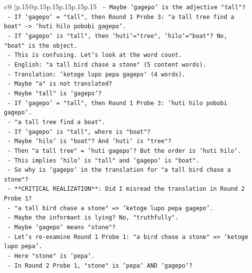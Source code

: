 \documentclass{article}
\begin{document}
{\begin{supertabular}{c@{$\;$}|p{.15\linewidth}@{}p{.15\linewidth}p{.15\linewidth}p{.15\linewidth}p{.15\linewidth}p{.15\linewidth}}
{{{\texttt{      {-} Maybe `gagepo` is the adjective "tall"?} \\
\texttt{      {-} If `gagepo` = "tall", then Round 1 Probe 3: "a tall tree find a boat" {-}> `huti hilo pobobi gagepo`.} \\
\texttt{        {-} If `gagepo` is "tall", then `huti`="tree", `hilo`="boat"? No, "boat" is the object.} \\
\texttt{        {-} This is confusing. Let's look at the word count.} \\
\texttt{        {-} English: "a tall bird chase a stone" (5 content words).} \\
\texttt{        {-} Translation: `ketoge lupo pepa gagepo` (4 words).} \\
\texttt{        {-} Maybe "a" is not translated?} \\
\texttt{        {-} Maybe "tall" is `gagepo`?} \\
\texttt{        {-} If `gagepo` = "tall", then Round 1 Probe 3: `huti hilo pobobi gagepo`.} \\
\texttt{          {-} "a tall tree find a boat".} \\
\texttt{          {-} If `gagepo` is "tall", where is "boat"?} \\
\texttt{          {-} Maybe `hilo` is "boat"? And `huti` is "tree"?} \\
\texttt{          {-} Then "a tall tree" = `huti gagepo`? But the order is `huti hilo`.} \\
\texttt{          {-} This implies `hilo` is "tall" and `gagepo` is "boat".} \\
\texttt{          {-} So why is `gagepo` in the translation for "a tall bird chase a stone"?} \\
\texttt{          {-} **CRITICAL REALIZATION**: Did I misread the translation in Round 2 Probe 1?} \\
\texttt{          {-} "a tall bird chase a stone" => `ketoge lupo pepa gagepo`.} \\
\texttt{          {-} Maybe the informant is lying? No, "truthfully".} \\
\texttt{          {-} Maybe `gagepo` means "stone"?} \\
\texttt{          {-} Let's re{-}examine Round 1 Probe 1: "a bird chase a stone" => `ketoge lupo pepa`.} \\
\texttt{          {-} Here "stone" is `pepa`.} \\
\texttt{          {-} In Round 2 Probe 1, "stone" is `pepa` AND `gagepo`?} \\
}}}
\end{supertabular}}
\end{document}
